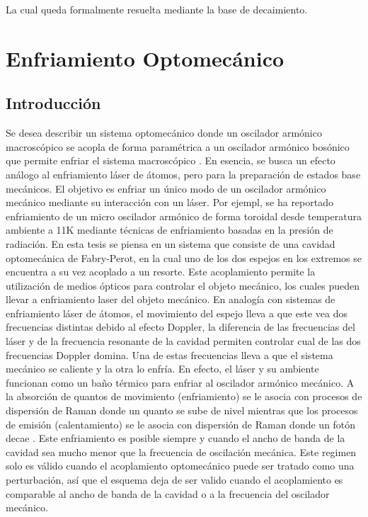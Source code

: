 \documentclass[a4paper,10pt]{report}
\begin{document}
La cual queda formalmente resuelta mediante la base de decaimiento.


\chapter{Enfriamiento Optomecánico}

\section{Introducción}

Se desea describir un sistema optomecánico donde un oscilador armónico macroscópico se acopla de forma paramétrica a un oscilador armónico bosónico que permite enfriar el sistema macroscópico \cite{NooshiLC}. En esencia, se busca un efecto análogo al enfriamiento láser de átomos, pero para la preparación de estados base mecánicos. El objetivo es enfriar un único modo de un oscilador armónico mecánico mediante su interacción con un láser. Por ejempl, se ha reportado enfriamiento de un micro oscilador armónico de forma toroidal desde temperatura ambiente a 11K mediante técnicas de enfriamiento basadas en la presión de radiación\cite{SchliesserRPC}. En esta tesis se piensa en un sistema que consiste de una cavidad optomecánica de Fabry-Perot, en la cual uno de los dos espejos en los extremos se encuentra a su vez acoplado a un resorte. Este acoplamiento permite la utilización de medios ópticos para controlar el objeto mecánico, los cuales pueden llevar a enfriamiento laser del objeto mecánico\cite{NooshiLC}. En analogía con sistemas de enfriamiento láser de átomos, el movimiento del espejo lleva a que este vea dos frecuencias distintas debido al efecto Doppler\cite{KippenberCO}, la diferencia de las frecuencias del láser y de la frecuencia resonante de la cavidad permiten controlar cual de las dos frecuencias Doppler domina. Una de estas frecuencias lleva a que el sistema mecánico se caliente y la otra lo enfría. En efecto, el láser y su ambiente funcionan como un baño térmico para enfriar al oscilador armónico mecánico. A la absorción de quantos de movimiento (enfriamiento) se le asocia con procesos de dispersión de Raman donde un quanto se sube de nivel mientras que los procesos de emisión (calentamiento) se le asocia con dispersión de Raman donde un fotón decae \cite{LCNooshi}. Este enfriamiento es posible siempre y cuando el ancho de banda de la cavidad sea mucho menor que la frecuencia de oscilación mecánica. \cite{LCNooshi} \cite{MarquardtSC} Este regimen solo es válido cuando el acoplamiento optomecánico puede ser tratado como una perturbación, así que el esquema deja de ser valido cuando el acoplamiento es comparable al ancho de banda de la cavidad o a la frecuencia del oscilador mecánico.
\end{document}
